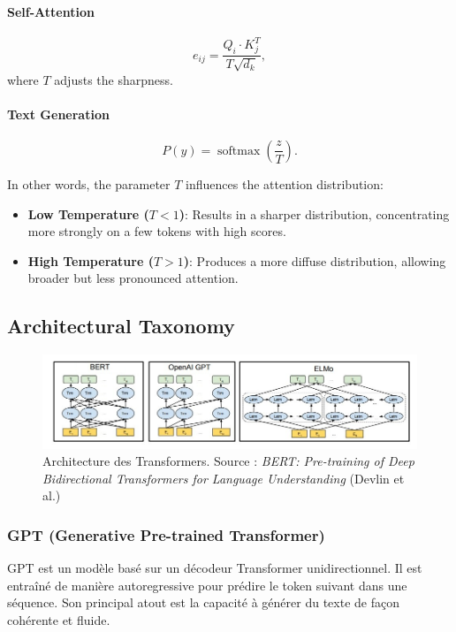\documentclass{article}
\begin{document}
\paragraph{Self-Attention}
\[
e_{ij} = \frac{Q_i \cdot K_j^T}{T\sqrt{d_k}},
\]
where \(T\) adjusts the sharpness.

\paragraph{Text Generation}
\[
P(y) = \operatorname{softmax}\left(\frac{z}{T}\right).
\]

In other words, the parameter \( T \) influences the attention distribution:
\begin{itemize}
    \item \textbf{Low Temperature (\( T < 1 \))}: Results in a sharper distribution, concentrating more strongly on a few tokens with high scores.
    \item \textbf{High Temperature (\( T > 1 \))}: Produces a more diffuse distribution, allowing broader but less pronounced attention.
\end{itemize}


\subsection{Architectural Taxonomy}
\begin{figure}[h!]
    \centering
    \includegraphics[width=\linewidth]{graphics/S7Transformers/transformers_architectures.jpg}
    \caption{Architecture des Transformers. Source : \textit{BERT: Pre-training of Deep Bidirectional Transformers for Language Understanding} (Devlin et al.)}
    \label{fig:transformers_architecture}
\end{figure}

\subsubsection{GPT (Generative Pre-trained Transformer)}
GPT est un modèle basé sur un décodeur Transformer unidirectionnel. Il est entraîné de manière autoregressive pour prédire le token suivant dans une séquence. Son principal atout est la capacité à générer du texte de façon cohérente et fluide.
\end{document}
